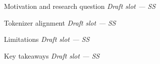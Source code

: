 \begin{frame}{Motivation and research question}
  \centering\textit{Draft slot --- SS}
\end{frame}
\begin{frame}{Tokenizer alignment}
  \centering\textit{Draft slot --- SS}
\end{frame}
\begin{frame}{Limitations}
  \centering\textit{Draft slot --- SS}
\end{frame}
\begin{frame}{Key takeaways}
  \centering\textit{Draft slot --- SS}
\end{frame}
